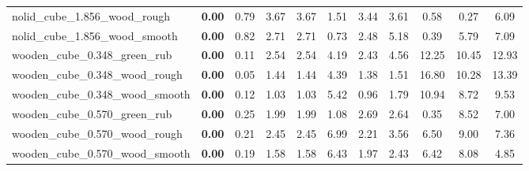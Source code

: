 \begin{table}[H]
{\begin{tabular}{l cccccccccc}
        nolid\_cube\_1.856\_wood\_rough & \textbf{0.00} & 0.79 & 3.67 & 3.67 & 1.51 & 3.44 & 3.61 & 0.58 & 0.27 & 6.09 \\
        nolid\_cube\_1.856\_wood\_smooth & \textbf{0.00} & 0.82 & 2.71 & 2.71 & 0.73 & 2.48 & 5.18 & 0.39 & 5.79 & 7.09 \\
        wooden\_cube\_0.348\_green\_rub & \textbf{0.00} & 0.11 & 2.54 & 2.54 & 4.19 & 2.43 & 4.56 & 12.25 & 10.45 & 12.93 \\
        wooden\_cube\_0.348\_wood\_rough & \textbf{0.00} & 0.05 & 1.44 & 1.44 & 4.39 & 1.38 & 1.51 & 16.80 & 10.28 & 13.39 \\
        wooden\_cube\_0.348\_wood\_smooth & \textbf{0.00} & 0.12 & 1.03 & 1.03 & 5.42 & 0.96 & 1.79 & 10.94 & 8.72 & 9.53 \\
        wooden\_cube\_0.570\_green\_rub & \textbf{0.00} & 0.25 & 1.99 & 1.99 & 1.08 & 2.69 & 2.64 & 0.35 & 8.52 & 7.00 \\
        wooden\_cube\_0.570\_wood\_rough & \textbf{0.00} & 0.21 & 2.45 & 2.45 & 6.99 & 2.21 & 3.56 & 6.50 & 9.00 & 7.36 \\
        wooden\_cube\_0.570\_wood\_smooth & \textbf{0.00} & 0.19 & 1.58 & 1.58 & 6.43 & 1.97 & 2.43 & 6.42 & 8.08 & 4.85 \\
        \bottomrule
    \end{tabular}
    }
\end{table}



\vspace{1cm}

\clearpage

